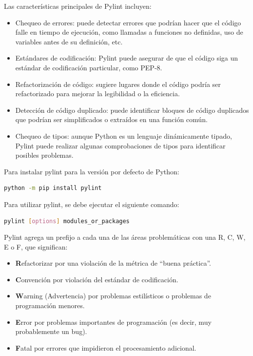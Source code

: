 Las características principales de Pylint incluyen:

\begin{itemize}
    \item Chequeo de errores: puede detectar errores que podrían hacer que el código falle en tiempo de ejecución, como llamadas a funciones no definidas, uso de variables antes de su definición, etc.
    \item Estándares de codificación: Pylint puede asegurar de que el código siga un estándar de codificación particular, como PEP-8.
    \item Refactorización de código: sugiere lugares donde el código podría ser refactorizado para mejorar la legibilidad o la eficiencia.
    \item Detección de código duplicado: puede identificar bloques de código duplicados que podrían ser simplificados o extraídos en una función común.
    \item Chequeo de tipos: aunque Python es un lenguaje dinámicamente tipado, Pylint puede realizar algunas comprobaciones de tipos para identificar posibles problemas.
\end{itemize}

Para instalar pylint para la versión por defecto de Python:

\begin{lstlisting}[language=bash]
python -m pip install pylint
\end{lstlisting}

Para utilizar pylint, se debe ejecutar el siguiente comando:

\begin{lstlisting}[language=bash]
pylint [options] modules_or_packages
\end{lstlisting}

%

Pylint agrega un prefijo a cada una de las áreas problemáticas con una R, C, W, E o F, que significan:

\begin{itemize}
    \item \textbf{R}efactorizar por una violación de la métrica de ``buena práctica''.
    \item \textbf{C}onvención por violación del estándar de codificación.
    \item \textbf{W}arning (Advertencia) por problemas estilísticos o problemas de programación menores.
    \item \textbf{E}rror por problemas importantes de programación (es decir, muy probablemente un bug).
    \item \textbf{F}atal por errores que impidieron el procesamiento adicional.
\end{itemize}

